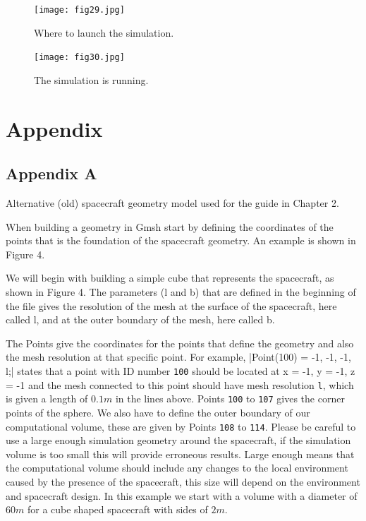 \documentclass[a4paper, 11pt]{article}
\begin{document}
\begin{figure}[!ht]
    \centering
    \texttt{[image: fig29.jpg]}
    \caption{Where to launch the simulation.}
\end{figure}

\begin{figure}[!ht]
    \centering
    \texttt{[image: fig30.jpg]}
    \caption{The simulation is running.}
\end{figure}

\section{}

\section{Appendix}
\subsection{Appendix A}

Alternative (old) spacecraft geometry model used for the guide in Chapter 2.\par
When building a geometry in Gmsh start by defining the coordinates of the points that is the foundation of the spacecraft geometry. An example is shown in Figure 4.\par
We will begin with building a simple cube that represents the spacecraft, as shown in Figure 4. The parameters (l and b) that are defined in the beginning of the file gives the resolution of the mesh at the surface of the spacecraft, here called l, and at the outer boundary of the mesh, here called b.\par
The Points give the coordinates for the points that define the geometry and also the mesh resolution at that specific point. For example, |Point(100) = {-1, -1, -1, l};| states that a point with ID number \verb|100| should be located at x = -1, y = -1, z = -1 and the mesh connected to this point should have mesh resolution \verb|l|, which is given a length of $0.1 \si{m}$ in the lines above. Points \verb|100| to \verb|107| gives the corner points of the sphere. We also have to define the outer boundary of our computational volume, these are given by Points \verb|108| to \verb|114|. Please be careful to use a large enough simulation geometry around the spacecraft, if the simulation volume is too small this will provide erroneous results. Large enough means that the computational volume should include any changes to the local environment caused by the presence of the spacecraft, this size will depend on the environment and spacecraft design. In this example we start with a volume with a diameter of $60 \si{m}$ for a cube shaped spacecraft with sides of $2 \si{m}$.
\end{document}
